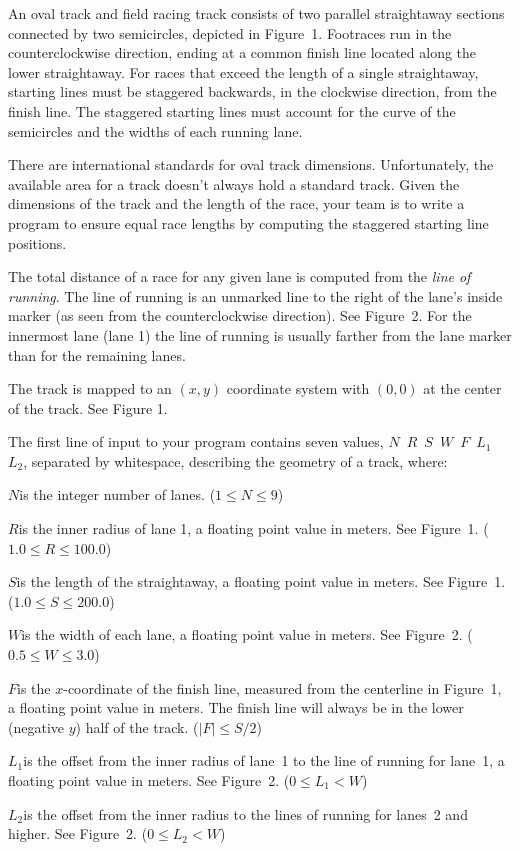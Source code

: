 

\def\probno{?}
\def\probname{Staggering to the Finish}
\def\headeryear{2020/2021}
\fullheader
\par
An oval track and field racing track consists of two parallel
straightaway sections connected by two semicircles, depicted in
Figure~1.  Footraces run in the counterclockwise direction, ending at
a common finish line located along the lower straightaway.  For races
that exceed the length of a single straightaway, starting lines must
be staggered backwards, in the clockwise direction, from the finish
line.  The staggered starting lines must account for the curve of the
semicircles and the widths of each running lane.
\par
There are international standards for oval track dimensions.
Unfortunately, the available area for a track doesn't always hold a
standard track.  Given the dimensions of the track and the length of
the race, your team is to write a program to ensure equal race lengths
by computing the staggered starting line positions.
\par
The total distance of a race for any given lane is computed from the
{\sl line of running}.  The line of running is an unmarked line to
the right of the lane's inside marker (as seen from the
counterclockwise direction).  See Figure~2.  For the innermost lane
(lane 1) the line of running is usually farther from the lane marker
than for the remaining lanes.
\par
The track is mapped to an $(x, y)$ coordinate system with $(0, 0)$ at the
center of the track.  See Figure 1.
\par
The first line of input to your program contains seven values,
\hbox{$N$ $R$ $S$ $W$ $F$ $L_1$ $L_2$},
separated by whitespace, describing the geometry of a track, where:
{\parskip=0pt
\item{$N$}is the integer number of lanes. ($1 \le N \le 9$)
\item{$R$}is the inner radius of lane 1, a floating point value in meters.  See Figure~1.  ($1.0 \le R \le 100.0$)
\item{$S$}is the length of the straightaway, a floating point value in meters.
See Figure~1.  ($1.0 \le S \le 200.0$)
\item{$W$}is the width of each lane, a floating point value in meters.
See Figure~2.  ($0.5 \le W \le 3.0$)
\item{$F$}is the $x$-coordinate of the finish line, measured from the centerline in Figure~1, a floating point value
          in meters.  The finish line will always be in the lower (negative $y$) half of the track.  ($\vert F\vert \le S / 2$)
\item{$L_1$}is the offset from the inner radius of lane~1 to the line of running for lane~1, a floating point value in meters.
          See Figure~2.  ($0 \le L_1 < W$)
\item{$L_2$}{is the offset from the inner radius to the lines of running for lanes~2 and higher.  See Figure~2.}  ($0 \le L_2 < W$)

}
